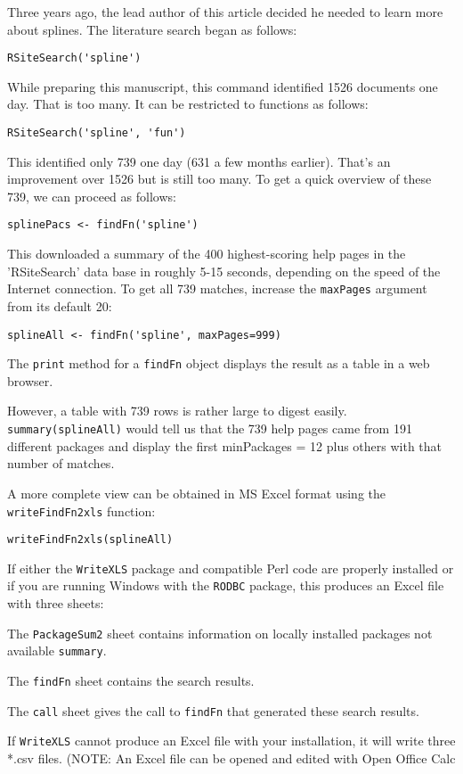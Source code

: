 Three years ago, the lead author of this article decided he
needed to learn more about splines.  The literature search
began as follows:
\begin{verbatim}
RSiteSearch('spline')
\end{verbatim}
While preparing this manuscript, this command identified
1526 documents one day.  That is too many.  It can be
restricted to functions as follows:
\begin{verbatim}
RSiteSearch('spline', 'fun')
\end{verbatim}
This identified only 739 one day (631 a few months earlier).  
That's an improvement over 1526 but is still too many.
To get a quick overview of these 739, we can proceed
as follows:
\begin{verbatim}
splinePacs <- findFn('spline')
\end{verbatim}
This downloaded a summary of the 400 highest-scoring help pages
in the 'RSiteSearch' data base in roughly 5-15 seconds, depending
on the speed of the Internet connection.  To get all 739 matches,
increase the {\tt maxPages} argument from its default 20:
\begin{verbatim}
splineAll <- findFn('spline', maxPages=999)
\end{verbatim}
The {\tt print} method for a {\tt findFn} object displays the 
result as a table in a web browser.

However, a table with 739 rows is rather large to digest easily.
{\tt summary(splineAll)} would tell us that the 739 help pages 
came from 191 different packages and display the first
minPackages = 12 plus others with that number of matches.

A more complete view can be obtained in MS Excel format
using the {\tt writeFindFn2xls} function:
\begin{verbatim}
writeFindFn2xls(splineAll)
\end{verbatim}
If either the {\tt WriteXLS} package and compatible Perl code 
are properly installed or if you are running Windows with 
the {\tt RODBC} package, this produces an Excel file with 
three sheets:

The {\tt PackageSum2} sheet contains information on locally
installed packages not available {\tt summary}.

The {\tt findFn} sheet contains the search results.

The {\tt call} sheet gives the call to {\tt findFn}
that generated these search results.

If {\tt WriteXLS} cannot produce an Excel file with your 
installation, it will write three *.csv files.  (NOTE:  
An Excel file can be opened and edited with Open Office
Calc


